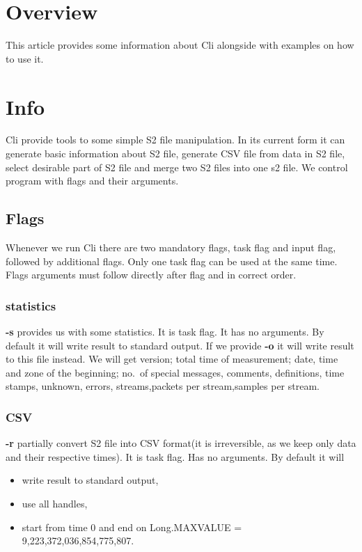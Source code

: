 \documentclass[english]{article}
\begin{document}
\section{Overview}

This article provides some information about Cli alongside with examples on how to use it.

\section{Info}

Cli provide tools to some simple S2 file manipulation. In its current form it can generate basic information about S2 file, generate CSV file from data in S2 file, select desirable part of S2 file and merge two S2 files into one s2 file.
We control program with flags and their arguments.

\subsection{Flags}
Whenever we run Cli there are two mandatory flags, task flag and input flag, followed by additional flags. Only one task flag can be used at the same time. Flags arguments must follow directly after flag and in correct order.


\subsubsection{statistics}
\textbf{-s} provides us with some statistics. It is task flag. It has no arguments. By default it will write result to standard output. If we provide \textbf{-o} it will write result to this file instead. We will get  version; total time of measurement; date, time and zone of the beginning; no.\ of special messages, comments,   definitions, time stamps, unknown, errors, streams,packets per stream,samples per stream.

\subsubsection{CSV}
\textbf{-r} partially convert S2 file into CSV format(it is irreversible, as we keep only data and their respective times). It is task flag. Has no arguments. By default it will 
\begin{itemize}
\item  write result to standard output,
\item use all handles,
\item start from time 0 and end on Long.MAXVALUE = 9,223,372,036,854,775,807.
\end{itemize}
\end{document}
